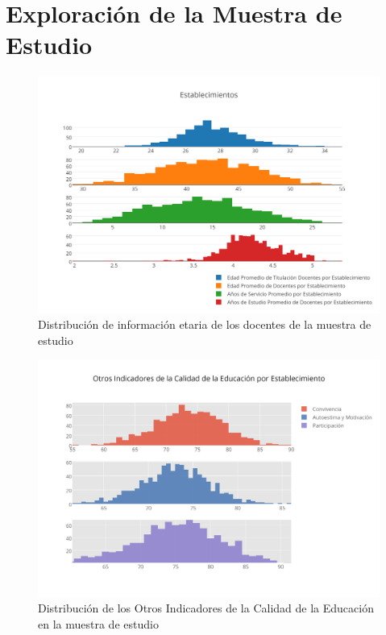 \section{Exploración de la Muestra de Estudio}
\label{an:explod}

\begin{figure}[H]
  \centering
  \includegraphics[scale=0.8]{Figuras/6SolucionPropuesta/edadespromedio.png}
      \caption{Distribución de información etaria de los docentes de la muestra de estudio}
    \label{fig:came1}
\end{figure}

\begin{figure}[H]
  \centering
  \includegraphics[scale=0.8]{Figuras/6SolucionPropuesta/OIC.png}
      \caption{Distribución de los Otros Indicadores de la Calidad de la Educación en la muestra de estudio}
    \label{fig:came2}
\end{figure}

